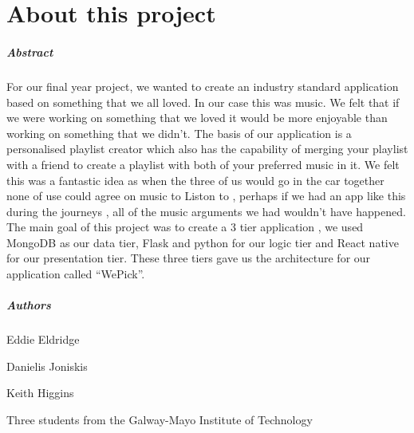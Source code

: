 
\chapter*{About this project}
\paragraph{Abstract}
For our final year project, we wanted to create an industry standard application based on something that we all loved. In our case this was music. We felt that if we were working on something that we loved it would be more enjoyable than working on something that we didn’t. The basis of our application is a personalised playlist creator which also has the capability of merging your playlist with a friend to create a playlist with both of your preferred music in it. We felt this was a fantastic idea as when the three of us would go in the car together none of use could agree on music to Liston to ,  perhaps if we had an app like this during the journeys , all of the music arguments we had wouldn’t have happened. The main goal of this project was to create a 3 tier application , we used MongoDB as our data tier, Flask and python for our logic tier and React native for our presentation tier. These three tiers gave us the architecture for our application called “WePick”.

\paragraph{Authors}
\begin{flushleft}
	Eddie Eldridge
	
	Danielis Joniskis
	
	Keith Higgins 
	
	Three students from the Galway-Mayo Institute of Technology
\end{flushleft}



